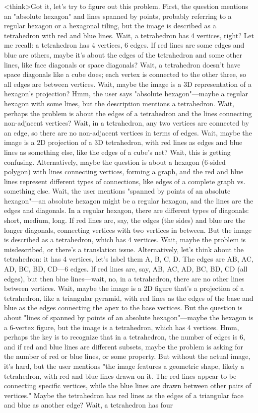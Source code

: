 <think>Got it, let's try to figure out this problem. First, the question mentions an "absolute hexagon" and lines spanned by points, probably referring to a regular hexagon or a hexagonal tiling, but the image is described as a tetrahedron with red and blue lines. Wait, a tetrahedron has 4 vertices, right? Let me recall: a tetrahedron has 4 vertices, 6 edges. If red lines are some edges and blue are others, maybe it's about the edges of the tetrahedron and some other lines, like face diagonals or space diagonals? Wait, a tetrahedron doesn't have space diagonals like a cube does; each vertex is connected to the other three, so all edges are between vertices. Wait, maybe the image is a 3D representation of a hexagon's projection? Hmm, the user says "absolute hexagon"—maybe a regular hexagon with some lines, but the description mentions a tetrahedron. Wait, perhaps the problem is about the edges of a tetrahedron and the lines connecting non-adjacent vertices? Wait, in a tetrahedron, any two vertices are connected by an edge, so there are no non-adjacent vertices in terms of edges. Wait, maybe the image is a 2D projection of a 3D tetrahedron, with red lines as edges and blue lines as something else, like the edges of a cube's net? Wait, this is getting confusing. Alternatively, maybe the question is about a hexagon (6-sided polygon) with lines connecting vertices, forming a graph, and the red and blue lines represent different types of connections, like edges of a complete graph vs. something else. Wait, the user mentions "spanned by points of an absolute hexagon"—an absolute hexagon might be a regular hexagon, and the lines are the edges and diagonals. In a regular hexagon, there are different types of diagonals: short, medium, long. If red lines are, say, the edges (the sides) and blue are the longer diagonals, connecting vertices with two vertices in between. But the image is described as a tetrahedron, which has 4 vertices. Wait, maybe the problem is misdescribed, or there's a translation issue. Alternatively, let's think about the tetrahedron: it has 4 vertices, let's label them A, B, C, D. The edges are AB, AC, AD, BC, BD, CD—6 edges. If red lines are, say, AB, AC, AD, BC, BD, CD (all edges), but then blue lines—wait, no, in a tetrahedron, there are no other lines between vertices. Wait, maybe the image is a 2D figure that's a projection of a tetrahedron, like a triangular pyramid, with red lines as the edges of the base and blue as the edges connecting the apex to the base vertices. But the question is about "lines of spanned by points of an absolute hexagon"—maybe the hexagon is a 6-vertex figure, but the image is a tetrahedron, which has 4 vertices. Hmm, perhaps the key is to recognize that in a tetrahedron, the number of edges is 6, and if red and blue lines are different subsets, maybe the problem is asking for the number of red or blue lines, or some property. But without the actual image, it's hard, but the user mentions "the image features a geometric shape, likely a tetrahedron, with red and blue lines drawn on it. The red lines appear to be connecting specific vertices, while the blue lines are drawn between other pairs of vertices." Maybe the tetrahedron has red lines as the edges of a triangular face and blue as another edge? Wait, a tetrahedron has four 